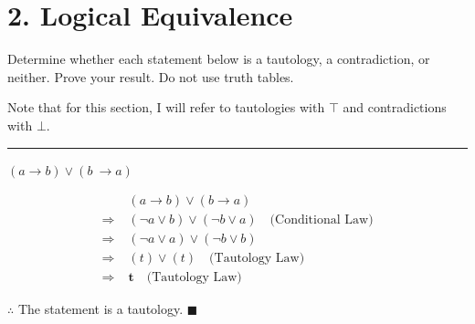 \documentclass[]{article}
\begin{document}
\section*{2. Logical Equivalence}
Determine whether each statement below is a tautology, a contradiction, or neither. Prove your result. Do not
use truth tables.

\begin{center}
    Note that for this section, I will refer to tautologies with $\top$ and contradictions with $\bot$.
\end{center}
\vspace{0.1in}
\hrule
\vspace{0.1in}
\begin{question}
    $(a \rightarrow b) \lor (b\ \rightarrow a)$
\end{question}
\begin{align*}
    & (a \rightarrow b) \lor (b \rightarrow a) \\
    \Rightarrow\; & (\neg a \lor b) \lor (\neg b \lor a) \quad \text{(Conditional Law)} \\
    \Rightarrow\; & (\neg a \lor a) \lor (\neg b \lor b) \quad \\
    \Rightarrow\;&  (t)  \lor (t) \quad \text{(Tautology Law)} \\
    \Rightarrow\; & \mathbf{t} \quad \text{(Tautology Law)}
\end{align*}
\begin{center}
    $\therefore$ The statement is a tautology. $\blacksquare$
\end{center}
\end{document}
